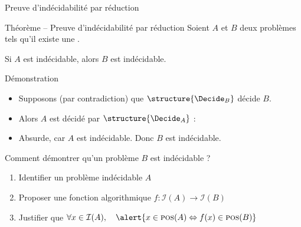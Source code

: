 
\begingroup


\begin{frame}{Preuve d'indécidabilité par réduction}
  
  \begin{block}{Théorème -- Preuve d'indécidabilité par réduction}
    Soient $A$ et $B$ deux problèmes tels qu'il existe une . 

    Si \alert{$A$ est indécidable}, alors \alert{$B$ est indécidable}.
  \end{block}

  \begin{block}{Démonstration}
    \begin{itemize}
    \item Supposons (par contradiction) que $\structure{\Decide_B}$ décide $B$.
    \item Alors $A$ est décidé par $\structure{\Decide_A}$ :
      \begin{algorithm}[H]
      \end{algorithm}
    \item Absurde, car $A$ est indécidable. Donc $B$ est indécidable. 
    \end{itemize}
  \end{block}

  \pause
  
  \begin{alertblock}{Comment démontrer qu'un problème $B$ est indécidable ?}
    \begin{enumerate}
    \item Identifier un problème \alert{indécidable $A$} 
    \item Proposer une \alert{fonction algorithmique} $f : \mathcal{I}(A) \rightarrow \mathcal{I}(B)$ 
    \item Justifier que $\forall x \in \mathcal{I}(A),\quad \alert{x\in \textsc{pos}(A) \Leftrightarrow f(x) \in  \textsc{pos}(B)}$
    \end{enumerate}
  \end{alertblock}
  
\end{frame}

\endgroup
\endinput
